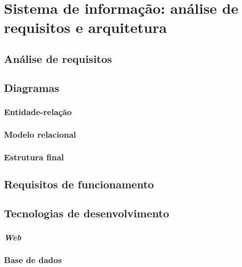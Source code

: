 \chapter{Sistema de informação: análise de requisitos e arquitetura}





\section{Análise de requisitos}



\section{Diagramas}


\subsection{Entidade-relação}


\subsection{Modelo relacional}


\subsection{Estrutura final}



\section{Requisitos de funcionamento}



\section{Tecnologias de desenvolvimento}





\subsection{\textit{Web}}


\subsection{Base de dados}



